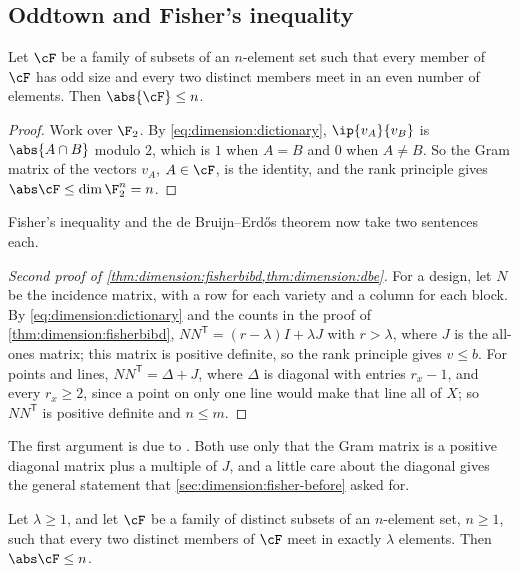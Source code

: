 \begin{refsection}
\subsection{Oddtown and Fisher's inequality}

\begin{theorem}[Oddtown]\label{thm:dimension:oddtown}
Let $\cF$ be a family of subsets of an $n$-element set such that every member of $\cF$ has odd size and every two distinct members meet in an even number of elements. Then $\abs{\cF}\le n$.
\end{theorem}

\begin{proof}
Work over $\F_2$. By \eqref{eq:dimension:dictionary}, $\ip{v_A}{v_B}$ is $\abs{A\cap B}$ modulo $2$, which is $1$ when $A=B$ and $0$ when $A\ne B$. So the Gram matrix of the vectors $v_A$, $A\in\cF$, is the identity, and the rank principle gives $\abs\cF\le\dim\F_2^n=n$.
\end{proof}

Fisher's inequality and the de Bruijn--Erd\H{o}s theorem now take two sentences each.

\begin{proof}[Second proof of \cref{thm:dimension:fisherbibd,thm:dimension:dbe}]
For a design, let $N$ be the incidence matrix, with a row for each variety and a column for each block. By \eqref{eq:dimension:dictionary} and the counts in the proof of \cref{thm:dimension:fisherbibd}, $NN^{\mathsf T}=(r-\lambda)I+\lambda J$ with $r>\lambda$, where $J$ is the all-ones matrix; this matrix is positive definite, so the rank principle gives $v\le b$. For points and lines, $NN^{\mathsf T}=\Delta+J$, where $\Delta$ is diagonal with entries $r_x-1$, and every $r_x\ge2$, since a point on only one line would make that line all of $X$; so $NN^{\mathsf T}$ is positive definite and $n\le m$.
\end{proof}

The first argument is due to \textcite{Bose1949}. Both use only that the Gram matrix is a positive diagonal matrix plus a multiple of $J$, and a little care about the diagonal gives the general statement that \cref{sec:dimension:fisher-before} asked for.

\begin{theorem}\label{thm:dimension:fisher}
Let $\lambda\ge1$, and let $\cF$ be a family of distinct subsets of an $n$-element set, $n\ge1$, such that every two distinct members of $\cF$ meet in exactly $\lambda$ elements. Then $\abs\cF\le n$.
\end{theorem}


\end{refsection}
